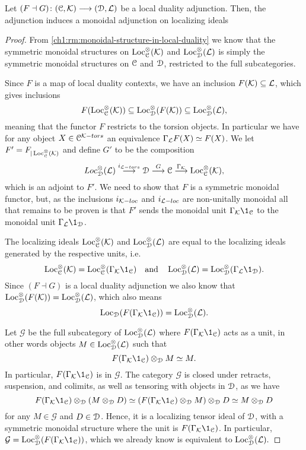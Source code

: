\begin{lemma}
    \label{ch1:lm:induced-torsion-adjunction}
    Let $(F\dashv G)\colon (\EuScript{C}, \mathcal{K})\longrightarrow (\EuScript{D}, \mathcal{L})$ be a local duality adjunction. Then, the adjunction induces a monoidal adjunction on localizing ideals
    \begin{center}
    \end{center}
\end{lemma}
\begin{proof}
    From \cref{ch1:rm:monoidal-structure-in-local-duality} we know that the symmetric monoidal structures on $\operatorname{Loc}^\otimes_{\EuScript{C}}(\mathcal{K})$ and $\operatorname{Loc}^\otimes_{\EuScript{D}}(\mathcal{L})$ is simply the symmetric monoidal structures on $\EuScript{C}$ and $\EuScript{D}$, restricted to the full subcategories. 
    
    Since $F$ is a map of local duality contexts, we have an inclusion $F(\mathcal{K})\subseteq \mathcal{L}$, which gives inclusions  
    \[F(\operatorname{Loc}^\otimes_{\EuScript{C}}(\mathcal{K}))\subseteq \operatorname{Loc}^\otimes_{\EuScript{D}}(F(\mathcal{K}))\subseteq \operatorname{Loc}^\otimes_{\EuScript{D}}(\mathcal{L}),\]
    meaning that the functor $F$ restricts to the torsion objects. In particular we have for any object $X\in \EuScript{C}^{\mathcal{K}-tors}$ an equivalence $\Gamma_{\mathcal{L}} F(X) \simeq F(X)$. We let $F'=F_{|\operatorname{Loc}^\otimes_{\EuScript{C}}(\mathcal{K})}$ and define $G'$ to be the composition 
    \[Loc^{\otimes}_{\EuScript{D}}(\mathcal{L})\overset{i_{\mathcal{L}-tors}}\longrightarrow \EuScript{D}\overset{G}\longrightarrow \EuScript{C}\overset{\Gamma_{\mathcal{K}}}\longrightarrow \operatorname{Loc}_{\EuScript{C}}^{\otimes}(\mathcal{K}),\]
    which is an adjoint to $F'$. We need to show that $F$ is a symmetric monoidal functor, but, as the inclusions $i_{\mathcal{K}-loc}$ and $i_{\mathcal{L}-loc}$ are non-unitally monoidal all that remains to be proven is that $F'$ sends the monoidal unit $\Gamma_\K \1_\C$ to the monoidal unit $\Gamma_\L \1_\D$. 

    The localizing ideals $\operatorname{Loc}_{\EuScript{C}}^\otimes(\mathcal{K})$ and $\operatorname{Loc}_{\EuScript{D}}^\otimes(\mathcal{L})$ are equal to the localizing ideals generated by the respective units, i.e. 
    \[\Loc_\C^\otimes(\K) = \Loc_\C^\otimes(\Gamma_\K\1_\C) \quad \text{and}\quad \Loc_\D^\otimes(\L) = \Loc_\D^\otimes(\Gamma_\L\1_\D).\]
    Since $(F\dashv G)$ is a local duality adjunction we also know that $\operatorname{Loc}^\otimes_{\EuScript{D}}(F(\mathcal{K}))= \operatorname{Loc}_{\EuScript{D}}^\otimes(\mathcal{L})$, which also means 
    \[\Loc_\D(F(\Gamma_\K \1_\C)) = \Loc_\D^\otimes(\L).\]

    Let $\mathcal{G}$ be the full subcategory of $\operatorname{Loc}_{\EuScript{D}}^\otimes(\mathcal{L})$ where $F(\Gamma_\K\1_\C)$ acts as a unit, in other words objects $M\in \operatorname{Loc}_{\EuScript{D}}^\otimes(\mathcal{L})$ such that 
    \[F(\Gamma_\K\1_\C)\otimes_{\D} M\simeq M.\] 
    In particular, $F(\Gamma_\K\1_\C)$ is in $\mathcal{G}$. The category $\mathcal{G}$ is closed under retracts, suspension, and colimits, as well as tensoring with objects in $\EuScript{D}$, as we have 
    \[F(\Gamma_\K\1_\C) \otimes_\D (M\otimes_\D D)\simeq (F(\Gamma_\K\1_\C)\otimes_\D M) \otimes_\D D \simeq M\otimes_\D D\]
    for any $M\in \mathcal{G}$ and $D\in \EuScript{D}$. Hence, it is a localizing tensor ideal of $\EuScript{D}$, with a symmetric monoidal structure where the unit is $F(\Gamma_\K\1_\C)$. In particular, $\mathcal{G} = \Loc_\D^\otimes(F(\Gamma_\K\1_\C))$, which we already know is equivalent to $\operatorname{Loc}_{\EuScript{D}}^\otimes(\mathcal{L}).$
    

\end{proof}
